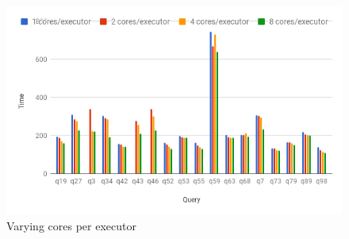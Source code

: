 \begin{figure}[h]
	\includegraphics[width=\linewidth]{fig/varycore.png}
	\caption{Varying cores per executor}
	\label{fig:varycore}
\end{figure}


